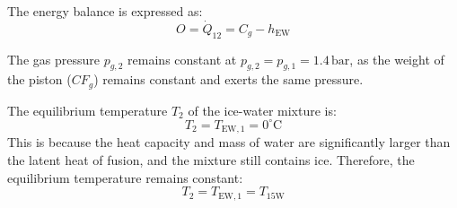 The energy balance is expressed as:  
\[
O = \dot{Q}_{12} = C_g - h_{\text{EW}}
\]

The gas pressure \( p_{g,2} \) remains constant at \( p_{g,2} = p_{g,1} = 1.4 \, \text{bar} \), as the weight of the piston (\( CF_g \)) remains constant and exerts the same pressure.

The equilibrium temperature \( T_2 \) of the ice-water mixture is:  
\[
T_2 = T_{\text{EW},1} = 0^\circ\text{C}
\]  
This is because the heat capacity and mass of water are significantly larger than the latent heat of fusion, and the mixture still contains ice. Therefore, the equilibrium temperature remains constant:  
\[
T_2 = T_{\text{EW},1} = T_{\text{15W}}
\]